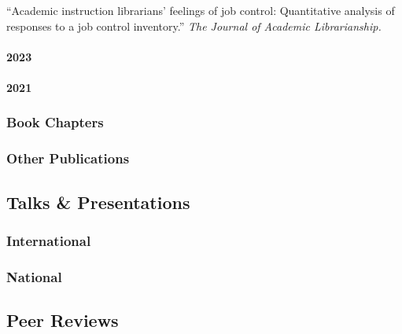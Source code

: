 \documentclass[
  letterpaper,
  DIV=11,
  numbers=noendperiod]{scrartcl}
\let\oldparagraph\paragraph
\renewcommand{\paragraph}[1]{\oldparagraph{#1}\mbox{}}
\begin{document}
``Academic instruction librarians' feelings of job control: Quantitative
analysis of responses to a job control inventory.'' \emph{The Journal of
Academic Librarianship.}

\paragraph{2023}\label{section-1}

\label{published-papers-2023}

\paragraph{2021}\label{section-2}

\label{published-papers-2021}

\subsubsection{\texorpdfstring{ Book
Chapters}{ Book Chapters}}\label{book-chapters}

\label{book-chapters}

\subsubsection{\texorpdfstring{ Other
Publications}{ Other Publications}}\label{other-publications}

\label{other}

\subsection{\texorpdfstring{ Talks \&
Presentations}{ Talks \& Presentations}}\label{talks-presentations}

\subsubsection{International}\label{international}

\label{talks-international}

\subsubsection{National}\label{national}

\label{talks-national}

\subsection{\texorpdfstring{ Peer
Reviews}{ Peer Reviews}}\label{peer-reviews}
\end{document}

